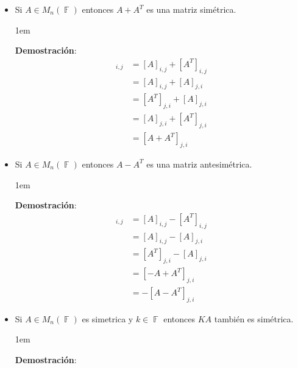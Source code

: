 \documentclass[12pt, fleqn]{article}                             %
\newenvironment{SmallIndentation}[1][0.75em]                    %
        {\begin{adjustwidth}{#1}{}\begin{footnotesize}}             %
        {\end{footnotesize}\end{adjustwidth}}                       %
\theoremstyle{break}                                            %
\DeclareMathOperator \GenericField {\mathbb{F}}                 %
\begin{document}
    \begin{itemize}

    \item Si $A \in M_{n}(\GenericField)$ entonces $A+A^T$ es una matriz simétrica. 

        \begin{SmallIndentation}[1em]
            \textbf{Demostración}:
            \begin{align*}
                [A + A^T]_{i,j}  
                    &=  [A]_{i,j} + [A^T]_{i,j}     \\ 
                    &=  [A]_{i,j} + [A]_{j,i}       \\
                    &=  [A^T]_{j,i} + [A]_{j,i}     \\
                    &=  [A]_{j,i} + [A^T]_{j, i}    \\
                    &=  [A + A^T]_{j, i}             
            \end{align*}

        \end{SmallIndentation}

    \item Si $A \in M_{n}(\GenericField)$ entonces $A-A^T$ es una matriz antesimétrica. 

        \begin{SmallIndentation}[1em]
            \textbf{Demostración}:
            \begin{align*}
                [A-A^T]_{i,j}   
                    &=  [A]_{i,j} - [A^T]_{i,j}     \\ 
                    &=  [A]_{i,j} - [A]_{j,i}       \\
                    &=  [A^T]_{j,i} - [A]_{j,i}     \\
                    &=  [-A+A^T]_{j, i}             \\
                    &= -[A - A^T]_{j, i}
            \end{align*}

        \end{SmallIndentation}

    \item Si $A \in M_{n}(\GenericField)$ es simetrica y $k \in \GenericField$ entonces 
        $KA$ también es simétrica.

        \begin{SmallIndentation}[1em]
            \textbf{Demostración}:


\end{SmallIndentation}
\end{itemize}
\end{document}
